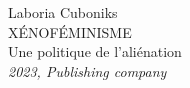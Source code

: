 \begin{titlepage}
    \raggedleft
    {\Large Laboria Cuboniks\\[1in]}
    {\Huge\scshape XÉNOFÉMINISME\\[.2in]}
    {\large Une politique de l’aliénation\\}
    \vfill
    {\itshape 2023, Publishing company}
    \end{titlepage}